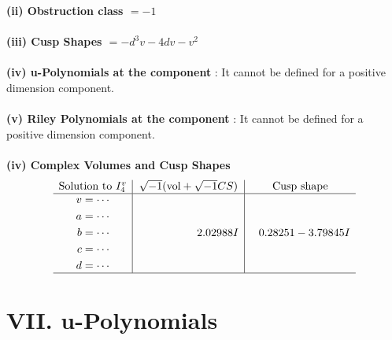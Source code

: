\documentclass[1p]{elsarticle_modified}
\theoremstyle{definition}
\newcommand{\I}{\sqrt{-1}}
\begin{document}
\flushleft \textbf{(ii) Obstruction class $= -1$}\\~\\
\flushleft \textbf{(iii) Cusp Shapes $= - d^3 v-4 d v- v^2$}\\~\\
\flushleft \textbf{(iv) u-Polynomials at the component} : It cannot be defined for a positive dimension component.\\~\\
\flushleft \textbf{(v) Riley Polynomials at the component} : It cannot be defined for a positive dimension component.\\~\\
\newpage\flushleft \textbf{(iv) Complex Volumes and Cusp Shapes}
$$\begin{array}{c|c|c} 
\text{Solution to }I^v_{4}& \I (\text{vol} + \sqrt{-1}CS) & \text{Cusp shape}\\
 \hline 
\begin{aligned}
v &= \cdots \\
a &= \cdots \\
b &= \cdots \\
c &= \cdots \\
d &= \cdots\end{aligned}
 & \phantom{-0.000000 -}2.02988 I & \phantom{-}0.28251 - 3.79845 I\\
 \hline 
 \end{array}
$$
\newpage\renewcommand{\arraystretch}{1}
\centering \section*{ VII. u-Polynomials}
\end{document}

